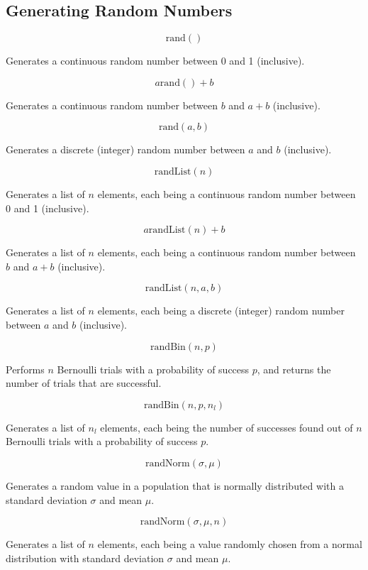 \documentclass[a4paper,11pt]{article}
\begin{document}
\subsection{Generating Random Numbers}

$$
\text{rand}()
$$

Generates a continuous random number between 0 and 1 (inclusive).

$$
a\text{rand}() + b
$$

Generates a continuous random number between $b$ and $a + b$ (inclusive).

$$
\text{rand}(a, b)
$$

Generates a discrete (integer) random number between $a$ and $b$ (inclusive).

$$
\text{randList}(n)
$$

Generates a list of $n$ elements, each being a continuous random number between
0 and 1 (inclusive).

$$
a \text{randList}(n) + b
$$

Generates a list of $n$ elements, each being a continuous random number between
$b$ and $a + b$ (inclusive).

$$
\text{randList}(n, a, b)
$$

Generates a list of $n$ elements, each being a discrete (integer) random number
between $a$ and $b$ (inclusive).

$$
\text{randBin}(n, p)
$$

Performs $n$ Bernoulli trials with a probability of success $p$, and returns the
number of trials that are successful.

$$
\text{randBin}(n, p, n_l)
$$

Generates a list of $n_l$ elements, each being the number of successes found out
of $n$ Bernoulli trials with a probability of success $p$.

$$
\text{randNorm}(\sigma, \mu)
$$

Generates a random value in a population that is normally distributed with a
standard deviation $\sigma$ and mean $\mu$.

$$
\text{randNorm}(\sigma, \mu, n)
$$

Generates a list of $n$ elements, each being a value randomly chosen from a
normal distribution with standard deviation $\sigma$ and mean $\mu$.
\end{document}
